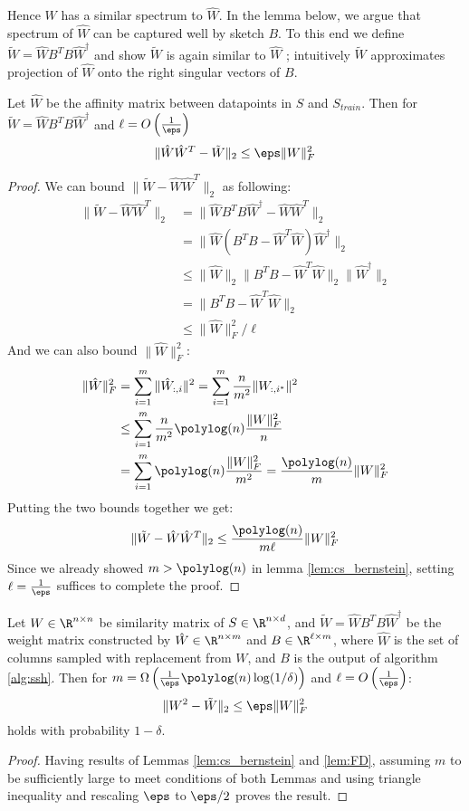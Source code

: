 \documentclass{sig-alternate}
\begin{document}
Hence $W$ has a similar spectrum to $\hat{W}$. In the lemma below, we argue that spectrum of $\hat{W}$ can be captured well by sketch $B$. To this end we define $\tilde W = \hat W B^TB \hat{W}^{\dagger}$ and show $\tilde{W}$ is again similar to $\hat{W}$ 
; intuitively $\tilde{W}$ approximates projection of $\hat{W}$ onto the right singular vectors of $B$.
\begin{lemma}
\label{lem:FD}
Let $\hat W$ be the affinity matrix between datapoints in $S$ and $S_{train}$. Then for $\tilde W = \hat W B^TB \hat{W}^{\dagger}$ and $\ell = O \left( \frac{1}{\eps} \right)$
\[
\|\hat{W}\hat{W}^T - \tilde{W}\|_2 \leq \eps \|W\|_F^2
\]
\end{lemma}
\begin{proof}
We can bound $\|\tilde{W} - \hat{W}\hat{W}^T\|_2$ as following:
\begin{align*}
\|\tilde{W} - \hat{W}\hat{W}^T\|_2 &= \|\hat{W}B^TB\hat{W}^{\dagger} - \hat{W}\hat{W}^T \|_2  \\
&= \| \hat{W}(B^TB - \hat{W}^T\hat{W})\hat{W}^{\dagger} \|_2 \\
&\leq \|\hat{W}\|_2 \|B^TB - \hat{W}^T\hat{W}\|_2 \|\hat{W}^{\dagger}\|_2 \\
&=\|B^TB - \hat{W}^T\hat{W}\|_2 \\
&\leq \|\hat{W}\|_F^2/\ell
\end{align*}
And we can also bound $\|\hat{W}\|_F^2$:
\begin{align*}
\|\hat W\|_F^2 &= \sum_{i=1}^m \|\hat{W}_{:,i}\|^2 = \sum_{i=1}^m \frac{n}{m^2} \|W_{:,i^*}\|^2\\
&\leq \sum_{i=1}^m \frac{n}{m^2} \polylog(n) \frac{\|W\|_F^2}{n} \\
&= \sum_{i=1}^m \polylog(n) \frac{\|W\|_F^2}{m^2} = \frac{\polylog(n)}{m} \|W\|_F^2
\end{align*}
Putting the two bounds together we get:
\[
\|\tilde{W} - \hat{W}\hat{W}^T\|_2 \leq \frac{\polylog(n)}{m \ell} \|W\|_F^2
\]
Since we already showed $m > \polylog(n)$ in lemma \ref{lem:cs_bernstein}, setting $\ell = \frac{1}{\eps}$ suffices to complete the proof.
\end{proof}

\begin{theorem}\label{thm:eq}
Let $W \in \R^{n \times n}$ be similarity matrix of $S \in \R^{n \times d}$, and $\tilde W = \hat W B^TB \hat{W}^{\dagger}$ be the weight matrix constructed by $\hat W \in \R^{n \times m}$ and $B \in \R^{\ell \times m}$, where $\hat W$ is the set of columns sampled with replacement from $W$, and $B$ is the output of algorithm \ref{alg:ssh}. Then for $m = \Omega \left(  \frac{1}{\eps} \polylog(n) \log(1/\delta) \right) $ and $\ell = O \left(\frac{1}{\eps} \right)$:
\[
\|W^2 - \tilde W\|_2 \leq \eps \|W\|_F^2
\]
holds with probability $1-\delta$.
\end{theorem}
\begin{proof}
Having results of Lemmas \ref{lem:cs_bernstein} and \ref{lem:FD}, assuming $m$ to be sufficiently large to meet conditions of both Lemmas and using triangle inequality and rescaling $\eps$ to $\eps/2$ proves the result.
\end{proof}
\end{document}

